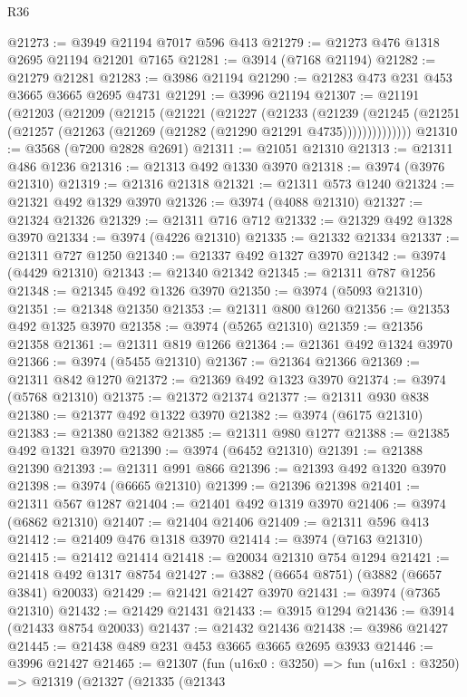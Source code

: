 \begin{lexlean}{R36}
\begin{coremodule}
@21273 := @3949 @21194 @7017 @596 @413
@21279 := @21273 @476 @1318 @2695 @21194 @21201 @7165
@21281 := @3914 (@7168 @21194)
@21282 := @21279 @21281
@21283 := @3986 @21194
@21290 := @21283 @473 @231 @453 @3665 @3665 @2695 @4731
@21291 := @3996 @21194
@21307 := @21191
    (@21203
      (@21209
        (@21215
          (@21221
            (@21227
              (@21233
                (@21239
                  (@21245 (@21251 (@21257 (@21263 (@21269 (@21282 (@21290 @21291 @4735))))))))))))))
@21310 := @3568 (@7200 @2828 @2691)
@21311 := @21051 @21310
@21313 := @21311 @486 @1236
@21316 := @21313 @492 @1330 @3970
@21318 := @3974 (@3976 @21310)
@21319 := @21316 @21318
@21321 := @21311 @573 @1240
@21324 := @21321 @492 @1329 @3970
@21326 := @3974 (@4088 @21310)
@21327 := @21324 @21326
@21329 := @21311 @716 @712
@21332 := @21329 @492 @1328 @3970
@21334 := @3974 (@4226 @21310)
@21335 := @21332 @21334
@21337 := @21311 @727 @1250
@21340 := @21337 @492 @1327 @3970
@21342 := @3974 (@4429 @21310)
@21343 := @21340 @21342
@21345 := @21311 @787 @1256
@21348 := @21345 @492 @1326 @3970
@21350 := @3974 (@5093 @21310)
@21351 := @21348 @21350
@21353 := @21311 @800 @1260
@21356 := @21353 @492 @1325 @3970
@21358 := @3974 (@5265 @21310)
@21359 := @21356 @21358
@21361 := @21311 @819 @1266
@21364 := @21361 @492 @1324 @3970
@21366 := @3974 (@5455 @21310)
@21367 := @21364 @21366
@21369 := @21311 @842 @1270
@21372 := @21369 @492 @1323 @3970
@21374 := @3974 (@5768 @21310)
@21375 := @21372 @21374
@21377 := @21311 @930 @838
@21380 := @21377 @492 @1322 @3970
@21382 := @3974 (@6175 @21310)
@21383 := @21380 @21382
@21385 := @21311 @980 @1277
@21388 := @21385 @492 @1321 @3970
@21390 := @3974 (@6452 @21310)
@21391 := @21388 @21390
@21393 := @21311 @991 @866
@21396 := @21393 @492 @1320 @3970
@21398 := @3974 (@6665 @21310)
@21399 := @21396 @21398
@21401 := @21311 @567 @1287
@21404 := @21401 @492 @1319 @3970
@21406 := @3974 (@6862 @21310)
@21407 := @21404 @21406
@21409 := @21311 @596 @413
@21412 := @21409 @476 @1318 @3970
@21414 := @3974 (@7163 @21310)
@21415 := @21412 @21414
@21418 := @20034 @21310 @754 @1294
@21421 := @21418 @492 @1317 @8754
@21427 := @3882 (@6654 @8751) (@3882 (@6657 @3841) @20033)
@21429 := @21421 @21427 @3970
@21431 := @3974 (@7365 @21310)
@21432 := @21429 @21431
@21433 := @3915 @1294
@21436 := @3914 (@21433 @8754 @20033)
@21437 := @21432 @21436
@21438 := @3986 @21427
@21445 := @21438 @489 @231 @453 @3665 @3665 @2695 @3933
@21446 := @3996 @21427
@21465 := @21307
    (fun (u16x0 : @3250) =>
    fun (u16x1 : @3250) =>
    @21319
      (@21327
        (@21335
          (@21343

\end{coremodule}
\end{lexlean}
